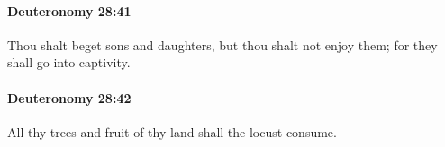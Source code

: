 		\paragraph{Deuteronomy 28:41} %
			\label{DEUTERONOMY-28-41}

			Thou shalt beget sons and daughters, but thou shalt not enjoy them; for they shall go into captivity.


		\paragraph{Deuteronomy 28:42} %
			\label{DEUTERONOMY-28-42}

			All thy trees and fruit of thy land shall the locust consume.



